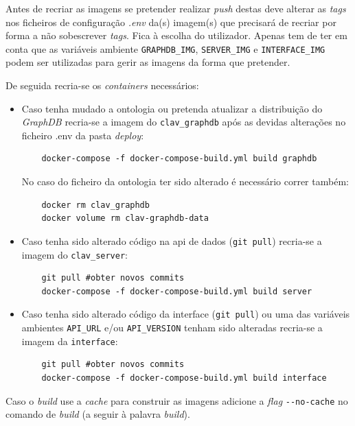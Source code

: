 Antes de recriar as imagens se pretender realizar \textit{push} destas deve alterar as \textit{tags} nos ficheiros de configuração \textit{.env} da(s) imagem(s) que precisará de recriar por forma a não sobescrever \textit{tags}. Fica à escolha do utilizador. Apenas tem de ter em conta que as variáveis ambiente \texttt{GRAPHDB\_IMG}, \texttt{SERVER\_IMG} e \texttt{INTERFACE\_IMG} podem ser utilizadas para gerir as imagens da forma que pretender.

De seguida recria-se os \textit{containers} necessários:
\begin{itemize}
    \item Caso tenha mudado a ontologia ou pretenda atualizar a distribuição do \textit{GraphDB} recria-se a imagem do \texttt{clav\_graphdb} após as devidas alterações no ficheiro .env da pasta \textit{deploy}:
    \footnotesize
    \begin{verbatim}
    docker-compose -f docker-compose-build.yml build graphdb
    \end{verbatim}
    \normalsize
    \vspace{-0.4cm}
    No caso do ficheiro da ontologia ter sido alterado é necessário correr também:
    \footnotesize
    \begin{verbatim}
    docker rm clav_graphdb
    docker volume rm clav-graphdb-data
    \end{verbatim}
    \normalsize
    \vspace{-0.5cm}
    \item Caso tenha sido alterado código na \acrshort{api} de dados (\verb|git pull|) recria-se a imagem do \texttt{clav\_server}:
    \footnotesize
    \begin{verbatim}
    git pull #obter novos commits
    docker-compose -f docker-compose-build.yml build server
    \end{verbatim}
    \normalsize
    \vspace{-0.5cm}
    \item Caso tenha sido alterado código da interface (\verb|git pull|) ou uma das variáveis ambientes \texttt{API\_URL} e/ou \texttt{API\_VERSION} tenham sido alteradas recria-se a imagem da \texttt{interface}:
    \footnotesize
    \begin{verbatim}
    git pull #obter novos commits
    docker-compose -f docker-compose-build.yml build interface
    \end{verbatim}
    \normalsize
    \vspace{-0.5cm}
\end{itemize}
Caso o \textit{build} use a \textit{cache} para construir as imagens adicione a \textit{flag} \verb|--no-cache| no comando de \textit{build} (a seguir à palavra \textit{build}).

